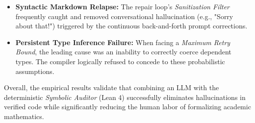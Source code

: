 \begin{itemize}
    \item \textbf{Syntactic Markdown Relapse:} The repair loop's \textit{Sanitization Filter} frequently caught and removed conversational hallucination (e.g., "Sorry about that!") triggered by the continuous back-and-forth prompt corrections.
    \item \textbf{Persistent Type Inference Failure:} When facing a \textit{Maximum Retry Bound}, the leading cause was an inability to correctly coerce dependent types. The compiler logically refused to concede to these probabilistic assumptions.
\end{itemize}

Overall, the empirical results validate that combining an LLM with the deterministic \textit{Symbolic Auditor} (Lean 4) successfully eliminates hallucinations in verified code while significantly reducing the human labor of formalizing academic mathematics.